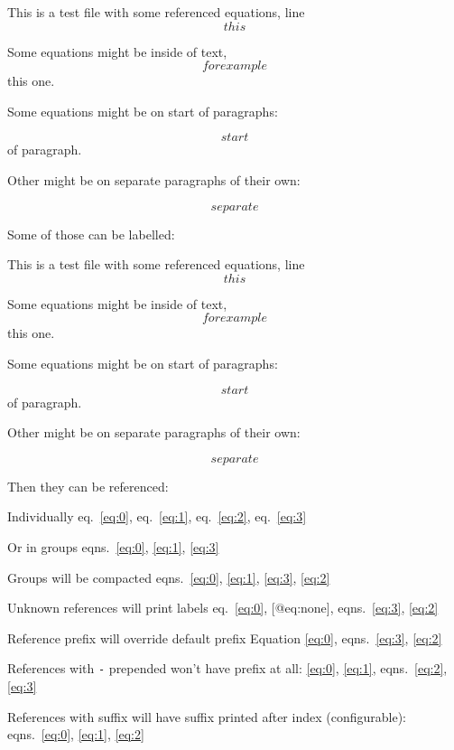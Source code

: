 This is a test file with some referenced equations, line \[ this \]

Some equations might be inside of text, \[ for example \] this one.

Some equations might be on start of paragraphs:

\[ start \] of paragraph.

Other might be on separate paragraphs of their own:

\[ separate \]

Some of those can be labelled:

This is a test file with some referenced equations, line
\begin{equation} this \label{eq:0}\end{equation}

Some equations might be inside of text,
\begin{equation} for example \label{eq:1}\end{equation} this one.

Some equations might be on start of paragraphs:

\begin{equation} start \label{eq:2}\end{equation} of paragraph.

Other might be on separate paragraphs of their own:

\begin{equation} separate \label{eq:3}\end{equation}

Then they can be referenced:

Individually eq.~\ref{eq:0}, eq.~\ref{eq:1}, eq.~\ref{eq:2},
eq.~\ref{eq:3}

Or in groups eqns.~\ref{eq:0}, \ref{eq:1}, \ref{eq:3}

Groups will be compacted
eqns.~\ref{eq:0}, \ref{eq:1}, \ref{eq:3}, \ref{eq:2}

Unknown references will print labels eq.~\ref{eq:0}, {[}@eq:none{]},
eqns.~\ref{eq:3}, \ref{eq:2}

Reference prefix will override default prefix Equation \ref{eq:0},
eqns.~\ref{eq:3}, \ref{eq:2}

References with \texttt{-} prepended won't have prefix at all:
\ref{eq:0}, \ref{eq:1}, eqns.~\ref{eq:2}, \ref{eq:3}

References with suffix will have suffix printed after index
(configurable): eqns.~\ref{eq:0}, \ref{eq:1}, \ref{eq:2}
